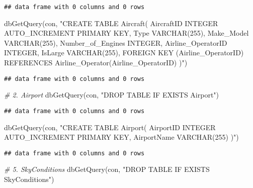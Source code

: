 \documentclass[
]{article}
\newenvironment{Shaded}{\begin{snugshade}}{\end{snugshade}}
\newcommand{\CommentTok}[1]{\textcolor[rgb]{0.56,0.35,0.01}{\textit{#1}}}
\newcommand{\FunctionTok}[1]{\textcolor[rgb]{0.00,0.00,0.00}{#1}}
\newcommand{\NormalTok}[1]{#1}
\newcommand{\StringTok}[1]{\textcolor[rgb]{0.31,0.60,0.02}{#1}}
\begin{document}
\begin{verbatim}
## data frame with 0 columns and 0 rows
\end{verbatim}

\begin{Shaded}
\begin{Highlighting}[]
\FunctionTok{dbGetQuery}\NormalTok{(con, }\StringTok{"CREATE TABLE Aircraft(}
\StringTok{    AircraftID INTEGER AUTO\_INCREMENT PRIMARY KEY,}
\StringTok{    Type VARCHAR(255),}
\StringTok{    Make\_Model VARCHAR(255),}
\StringTok{    Number\_of\_Engines INTEGER,}
\StringTok{    Airline\_OperatorID INTEGER,}
\StringTok{    IsLarge VARCHAR(255),}
\StringTok{    FOREIGN KEY (Airline\_OperatorID) REFERENCES Airline\_Operator(Airline\_OperatorID)}
\StringTok{)"}\NormalTok{)}
\end{Highlighting}
\end{Shaded}

\begin{verbatim}
## data frame with 0 columns and 0 rows
\end{verbatim}

\begin{Shaded}
\begin{Highlighting}[]
\CommentTok{\# 2. Airport}
\FunctionTok{dbGetQuery}\NormalTok{(con, }\StringTok{"DROP TABLE IF EXISTS Airport"}\NormalTok{)}
\end{Highlighting}
\end{Shaded}

\begin{verbatim}
## data frame with 0 columns and 0 rows
\end{verbatim}

\begin{Shaded}
\begin{Highlighting}[]
\FunctionTok{dbGetQuery}\NormalTok{(con, }\StringTok{"CREATE TABLE Airport(}
\StringTok{    AirportID INTEGER AUTO\_INCREMENT PRIMARY KEY,}
\StringTok{    AirportName VARCHAR(255)}
\StringTok{)"}\NormalTok{)}
\end{Highlighting}
\end{Shaded}

\begin{verbatim}
## data frame with 0 columns and 0 rows
\end{verbatim}

\begin{Shaded}
\begin{Highlighting}[]
\CommentTok{\# 5. SkyConditions}
\FunctionTok{dbGetQuery}\NormalTok{(con, }\StringTok{"DROP TABLE IF EXISTS SkyConditions"}\NormalTok{)}
\end{Highlighting}
\end{Shaded}
\end{document}
